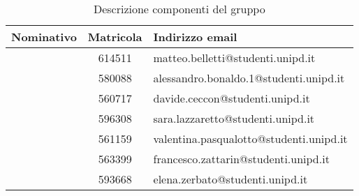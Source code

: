 {{\begin{table}[h]
\begin{center}
\begin{tabular}{l c l }
		\toprule
		Nominativo		& Matricola	& Indirizzo email\\ 
		\midrule
		\BM	& 614511	 & matteo.belletti@studenti.unipd.it\\
		\BA	& 580088	 & alessandro.bonaldo.1@studenti.unipd.it\\
		\CD	& 560717 & davide.ceccon@studenti.unipd.it\\ 
		\LS	& 596308 & sara.lazzaretto@studenti.unipd.it\\
		\PV & 561159 & valentina.pasqualotto@studenti.unipd.it\\
		\ZF	& 563399 & francesco.zattarin@studenti.unipd.it\\
		\ZE	& 593668 & elena.zerbato@studenti.unipd.it\\
		\bottomrule
		\end{tabular}
		\end{center}

	\caption{Descrizione componenti del gruppo}
		\end{table}
	}
	
}

